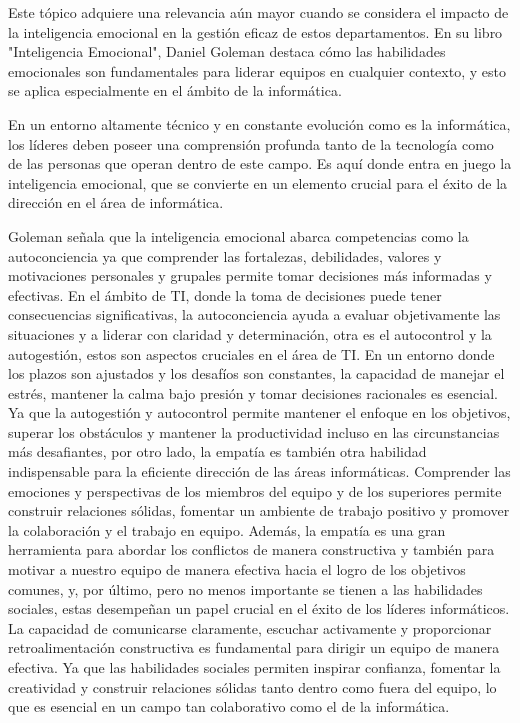 \documentclass[journal]{IEEEtran}
\begin{document}
Este tópico adquiere una relevancia aún mayor cuando se considera el impacto de la inteligencia emocional en la gestión eficaz de estos departamentos. En su libro "Inteligencia Emocional", Daniel Goleman destaca cómo las habilidades emocionales son fundamentales para liderar equipos en cualquier contexto, y esto se aplica especialmente en el ámbito de la informática.

En un entorno altamente técnico y en constante evolución como es la informática, los líderes deben poseer una comprensión profunda tanto de la tecnología como de las personas que operan dentro de este campo. Es aquí donde entra en juego la inteligencia emocional, que se convierte en un elemento crucial para el éxito de la dirección en el área de informática.

Goleman señala que la inteligencia emocional abarca competencias como la autoconciencia ya que comprender las fortalezas, debilidades, valores y motivaciones personales y grupales permite tomar decisiones más informadas y efectivas. En el ámbito de TI, donde la toma de decisiones puede tener consecuencias significativas, la autoconciencia ayuda a evaluar objetivamente las situaciones y a liderar con claridad y determinación, otra es el autocontrol y la autogestión, estos son aspectos cruciales en el área de TI. En un entorno donde los plazos son ajustados y los desafíos son constantes, la capacidad de manejar el estrés, mantener la calma bajo presión y tomar decisiones racionales es esencial. Ya que la autogestión y autocontrol permite mantener el enfoque en los objetivos, superar los obstáculos y mantener la productividad incluso en las circunstancias más desafiantes, por otro lado, la empatía es también otra habilidad indispensable para la eficiente dirección de las áreas informáticas. Comprender las emociones y perspectivas de los miembros del equipo y de los superiores permite construir relaciones sólidas, fomentar un ambiente de trabajo positivo y promover la colaboración y el trabajo en equipo. Además, la empatía es una gran herramienta para abordar los conflictos de manera constructiva y también para motivar a nuestro equipo de manera efectiva hacia el logro de los objetivos comunes, y, por último, pero no menos importante se tienen a las habilidades sociales, estas desempeñan un papel crucial en el éxito de los líderes informáticos. La capacidad de comunicarse claramente, escuchar activamente y proporcionar retroalimentación constructiva es fundamental para dirigir un equipo de manera efectiva. Ya que las habilidades sociales permiten inspirar confianza, fomentar la creatividad y construir relaciones sólidas tanto dentro como fuera del equipo, lo que es esencial en un campo tan colaborativo como el de la informática.
\end{document}
